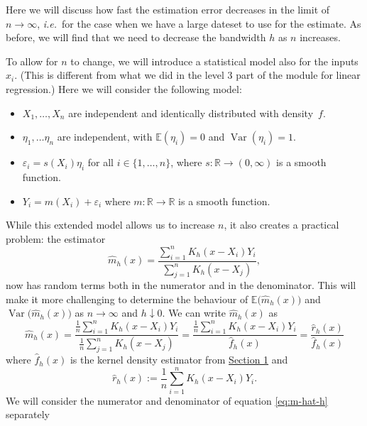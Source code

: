 \documentclass[
  a4paper,
]{article}
\providecommand{\tightlist}{%
  \setlength{\itemsep}{0pt}\setlength{\parskip}{0pt}}
\theoremstyle{definition}
\theoremstyle{definition}
\theoremstyle{definition}
\theoremstyle{definition}
\theoremstyle{remark}
\begin{document}
Here we will discuss how fast the estimation error decreases in the
limit of \(n\to \infty\), \emph{i.e.}~for the case when we have a large dateset
to use for the estimate. As before, we will find that we need to decrease
the bandwidth \(h\) as \(n\) increases.

To allow for \(n\) to change, we will introduce a statistical model
also for the inputs \(x_i\). (This is different from what we did
in the level 3 part of the module for linear regression.) Here
we will consider the following model:

\begin{itemize}
\tightlist
\item
  \(X_1, \ldots, X_n\) are independent and identically distributed with
  density~\(f\).
\item
  \(\eta_1, \ldots \eta_n\) are independent, with \(\mathbb{E}(\eta_i) = 0\)
  and \(\mathop{\mathrm{Var}}(\eta_i) = 1\).
\item
  \(\varepsilon_i = s(X_i) \eta_i\) for all \(i \in \{1, \ldots, n\}\),
  where \(s\colon \mathbb{R}\to (0, \infty)\) is a smooth function.
\item
  \(Y_i = m(X_i) + \varepsilon_i\) where \(m\colon \mathbb{R}\to \mathbb{R}\) is a smooth function.
\end{itemize}

While this extended model allows us to increase \(n\), it also creates
a practical problem: the estimator
\begin{equation*}
  \hat m_h(x)
  = \frac{\sum_{i=1}^n K_h(x - X_i) Y_i}{\sum_{j=1}^n K_h(x - X_j)},
\end{equation*}
now has random terms both in the numerator and in the denominator.
This will make it more challenging to determine the behaviour
of \(\mathbb{E}\bigl( \hat m_h(x) \bigr)\) and \(\mathop{\mathrm{Var}}\bigl( \hat m_h(x) \bigr)\)
as \(n \to \infty\) and \(h \downarrow 0\). We can write \(\hat m_h(x)\) as
\begin{equation}
  \hat m_h(x)
  = \frac{\frac1n \sum_{i=1}^n K_h(x - X_i) Y_i}{\frac1n \sum_{j=1}^n K_h(x - X_j)}
  = \frac{\frac1n \sum_{i=1}^n K_h(x - X_i) Y_i}{\hat f_h(x)}
  = \frac{\hat r_h(x)}{\hat f_h(x)}  \label{eq:m-hat-h}
\end{equation}
where \(\hat f_h(x)\) is the kernel density estimator from
\hyperref[X01-KDE]{Section 1} and
\begin{equation*}
  \hat r_h(x)
  := \frac1n \sum_{i=1}^n K_h(x - X_i) Y_i.
\end{equation*}
We will consider the numerator and denominator of equation \eqref{eq:m-hat-h}
separately
\end{document}
